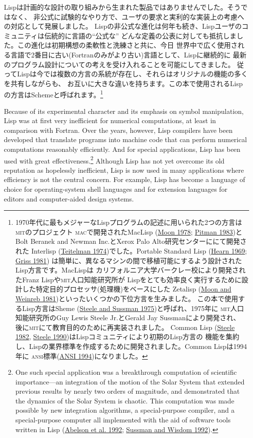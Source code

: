 \documentclass[8pt,oneside]{book}
\newcommand{\acronym}[1]{\textsc{\MakeLowercase{#1}}}
\newcommand{\link}[1]{\hyperref[#1]{#1}}
\begin{document}
Lispは計画的な設計の取り組みから生まれた製品ではありませんでした。そうではなく、
非公式に試験的なやり方で、ユーザの要求と実利的な実装上の考慮への対応として発展しました。
Lispの非公式な進化は何年も続き、Lispユーザのコミュニティは伝統的に言語の``公式な''
どんな定義の公表に対しても抵抗しました。この進化は初期構想の柔軟性と洗練さと共に、今日
世界中で広く使用される言語で2番目に古い(Fortranのみがより古い)言語として、Lispに継続的に
最新のプログラム設計についての考えを受け入れることを可能にしてきました。
従ってLispは今では複数の方言の系統が存在し、それらはオリジナルの機能の多くを共有しながらも、
お互いに大きな違いを持ちます。この本で使用されるLispの方言はSchemeと呼ばれます。\footnote{
1970年代に最もメジャーなLispプログラムの記述に用いられた2つの方言は\acronym{MIT}のプロジェクト
\acronym{MAC}で開発されたMacLisp (\link{Moon 1978}; \link{Pitman 1983})と
Bolt Beranek and Newman Inc.とXerox Palo Alto研究センターににて開発された
Interlisp (\link{Teitelman 1974})でした。Portable Standard Lisp (\link{Hearn 1969}; \link{Griss 1981})
は簡単に、異なるマシンの間で移植可能にするよう設計されたLisp方言です。MacLispは
カリフォルニア大学バークレー校により開発されたFranz Lispや\acronym{MIT}人口知能研究所が
Lispをとても効率良く実行するために設計した特定目的プロセッサ(処理機)をベースにした
Zetalisp (\link{Moon and Weinreb 1981})といったいくつかの下位方言を生みました。
この本で使用するLisp方言はSheme (\link{Steele and Sussman 1975})と呼ばれ、1975年に
\acronym{MIT}人口知能研究所のGuy Lewis Steele Jr.とGerald Jay Sussmanにより開発され、
後に\acronym{MIT}にて教育目的のために再実装されました。
Common Lisp (\link{Steele 1982}, \link{Steele 1990})はLispコミュニティにより初期のLisp方言の
機能を集約し、Lispの業界標準を作成するために開発されました。Common Lispは1994年に
\acronym{ANSI}標準(\link{ANSI 1994})になりました。
}

Because of its experimental character and its emphasis on symbol manipulation,
Lisp was at first very inefficient for numerical computations, at least in
comparison with Fortran.  Over the years, however, Lisp compilers have been
developed that translate programs into machine code that can perform numerical
computations reasonably efficiently.  And for special applications, Lisp has
been used with great effectiveness.\footnote{One such special application was a
breakthrough computation of scientific importance---an integration of the
motion of the Solar System that extended previous results by nearly two orders
of magnitude, and demonstrated that the dynamics of the Solar System is
chaotic.  This computation was made possible by new integration algorithms, a
special-purpose compiler, and a special-purpose computer all implemented with
the aid of software tools written in Lisp (\link{Abelson et al. 1992}; \link{Sussman and Wisdom 1992}).}  
Although Lisp has not yet overcome its old reputation as
hopelessly inefficient, Lisp is now used in many applications where efficiency
is not the central concern.  For example, Lisp has become a language of choice
for operating-system shell languages and for extension languages for editors
and computer-aided design systems.
\end{document}
